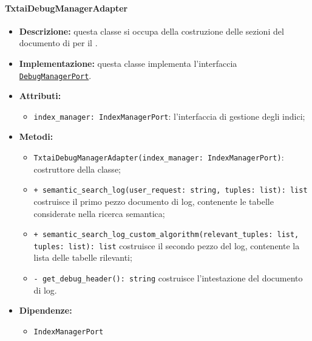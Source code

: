 \paragraph{TxtaiDebugManagerAdapter} \label{TxtaiDebugManagerAdapter}
\begin{itemize}
    \item \textbf{Descrizione:} questa classe si occupa della costruzione delle sezioni del documento di  per il .
    \item \textbf{Implementazione:} questa classe implementa l'interfaccia \hyperref[DebugManagerPort]{\texttt{DebugManagerPort}}.
    \item \textbf{Attributi:}
    \begin{itemize}
        \item \texttt{index\_manager: IndexManagerPort}: l'interfaccia di gestione degli indici;
    \end{itemize}
    \item \textbf{Metodi:}
    \begin{itemize}
        \item \texttt{TxtaiDebugManagerAdapter(index\_manager: IndexManagerPort)}: costruttore della classe;
        \item \texttt{+ semantic\_search\_log(user\_request: string, tuples: list): list} costruisce il primo pezzo documento di log, contenente le tabelle considerate nella ricerca semantica;
        \item \texttt{+ semantic\_search\_log\_custom\_algorithm(relevant\_tuples: list, tuples: list): list} costruisce il secondo pezzo del log, contenente la lista delle tabelle rilevanti;
        \item \texttt{- get\_debug\_header(): string} costruisce l'intestazione del documento di log.
    \end{itemize}
    \item \textbf{Dipendenze:}
    \begin{itemize}
        \item \texttt{IndexManagerPort}
    \end{itemize}
\end{itemize} 


